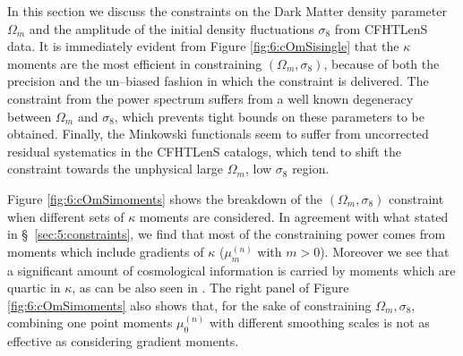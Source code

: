 %
In this section we discuss the constraints on the Dark Matter density parameter $\Omega_m$ and the amplitude of the initial density fluctuations $\sigma_8$ from CFHTLenS data. It is immediately evident from Figure \ref{fig:6:cOmSisingle} that the $\kappa$ moments are the most efficient in constraining $(\Omega_m,\sigma_8)$, because of both the precision and the un--biased fashion in which the constraint is delivered. The constraint from the power spectrum suffers from a well known degeneracy between $\Omega_m$ and $\sigma_8$, which prevents tight bounds on these parameters to be obtained. Finally, the Minkowski functionals seem to suffer from uncorrected residual systematics in the CFHTLenS catalogs, which tend to shift the constraint towards the unphysical large $\Omega_m$, low $\sigma_8$ region. 

Figure \ref{fig:6:cOmSimoments} shows the breakdown of the $(\Omega_m,\sigma_8)$ constraint when different sets of $\kappa$ moments are considered. In agreement with what stated in \S~\ref{sec:5:constraints}, we find that most of the constraining power comes from moments which include gradients of $\kappa$ ($\mu_{m}^{(n)}$ with $m>0$). Moreover we see that a significant amount of cosmological information is carried by moments which are quartic in $\kappa$, as can be also seen in \citep{JainKurt}. The right panel of Figure \ref{fig:6:cOmSimoments} also shows that, for the sake of constraining $\Omega_m,\sigma_8$, combining one point moments $\mu_0^{(n)}$ with different smoothing scales is not as effective as considering gradient moments.  

